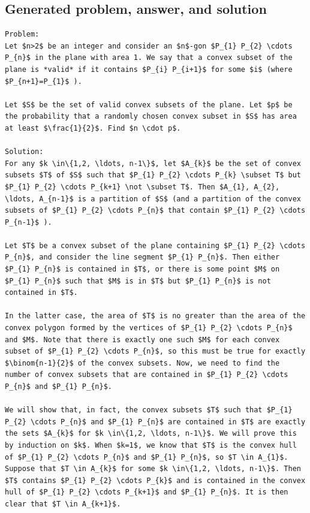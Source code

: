 \documentclass[11pt]{article}
\begin{document}
\subsection*{Generated problem, answer, and solution}
\begin{Verbatim}[breaklines=true,breakanywhere=true,fontsize=\small]
Problem:
Let $n>2$ be an integer and consider an $n$-gon $P_{1} P_{2} \cdots P_{n}$ in the plane with area 1. We say that a convex subset of the plane is *valid* if it contains $P_{i} P_{i+1}$ for some $i$ (where $P_{n+1}=P_{1}$ ).

Let $S$ be the set of valid convex subsets of the plane. Let $p$ be the probability that a randomly chosen convex subset in $S$ has area at least $\frac{1}{2}$. Find $n \cdot p$.

Solution:
For any $k \in\{1,2, \ldots, n-1\}$, let $A_{k}$ be the set of convex subsets $T$ of $S$ such that $P_{1} P_{2} \cdots P_{k} \subset T$ but $P_{1} P_{2} \cdots P_{k+1} \not \subset T$. Then $A_{1}, A_{2}, \ldots, A_{n-1}$ is a partition of $S$ (and a partition of the convex subsets of $P_{1} P_{2} \cdots P_{n}$ that contain $P_{1} P_{2} \cdots P_{n-1}$ ).

Let $T$ be a convex subset of the plane containing $P_{1} P_{2} \cdots P_{n}$, and consider the line segment $P_{1} P_{n}$. Then either $P_{1} P_{n}$ is contained in $T$, or there is some point $M$ on $P_{1} P_{n}$ such that $M$ is in $T$ but $P_{1} P_{n}$ is not contained in $T$.

In the latter case, the area of $T$ is no greater than the area of the convex polygon formed by the vertices of $P_{1} P_{2} \cdots P_{n}$ and $M$. Note that there is exactly one such $M$ for each convex subset of $P_{1} P_{2} \cdots P_{n}$, so this must be true for exactly $\binom{n-1}{2}$ of the convex subsets. Now, we need to find the number of convex subsets that are contained in $P_{1} P_{2} \cdots P_{n}$ and $P_{1} P_{n}$.

We will show that, in fact, the convex subsets $T$ such that $P_{1} P_{2} \cdots P_{n}$ and $P_{1} P_{n}$ are contained in $T$ are exactly the sets $A_{k}$ for $k \in\{1,2, \ldots, n-1\}$. We will prove this by induction on $k$. When $k=1$, we know that $T$ is the convex hull of $P_{1} P_{2} \cdots P_{n}$ and $P_{1} P_{n}$, so $T \in A_{1}$. Suppose that $T \in A_{k}$ for some $k \in\{1,2, \ldots, n-1\}$. Then $T$ contains $P_{1} P_{2} \cdots P_{k}$ and is contained in the convex hull of $P_{1} P_{2} \cdots P_{k+1}$ and $P_{1} P_{n}$. It is then clear that $T \in A_{k+1}$.


\end{Verbatim}
\end{document}
